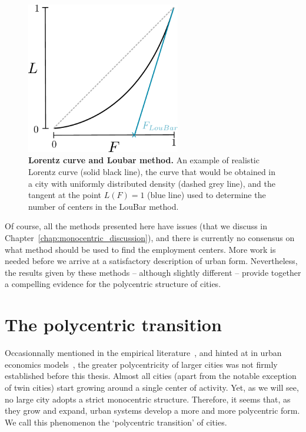 \begin{figure}
    \centering
    \includegraphics[width=0.6\textwidth]{gfx/chapter-monocentric/loubar.pdf}
    \caption{{\bf Lorentz curve and Loubar method.} An example of realistic Lorentz curve (solid black line), the curve
    that would be obtained in a city with uniformly distributed density (dashed
    grey line), and the tangent at the point $L(F) = 1$ (blue line) used to determine the number
of centers in the LouBar method.\label{fig:loubar}}
\end{figure}

Of course, all the methods presented here have issues (that we discuss 
in Chapter~\ref{chap:monocentric_discussion}), and there is currently no
consensus on what method should be used to find the employment centers.
More work is needed before we arrive at a satisfactory description of
urban form. Nevertheless, the results given by these methods -- although slightly
different -- provide together a compelling evidence for the polycentric
structure of cities. 


\section{The polycentric transition}
\label{sec:the_polycentric_transition}

Occasionnally mentioned in the empirical literature~\cite{McMillen:2003,
Redfearn:2007}, and hinted at in urban economics models~\cite{Fujita:1982},
the greater polycentricity of larger cities was not firmly established before
this thesis. Almost all cities (apart from the notable exception of twin cities)
start growing around a single center of activity. Yet, as we will see, no large
city adopts a strict monocentric structure. Therefore, it seems that, as
they grow and expand, urban systems develop a more and more polycentric form. We
call this phenomenon the `polycentric transition' of cities. 

